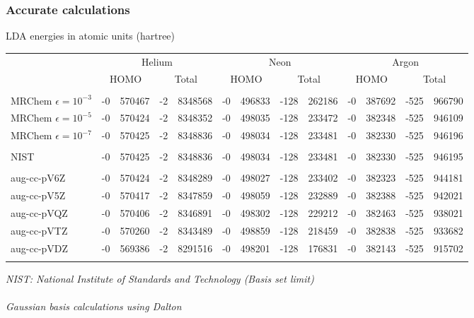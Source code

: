 \documentclass[mathserif]{beamer}
\begin{document}
\begin{frame}
    \frametitle{Accurate calculations}
    LDA energies in atomic units (hartree)
    \begin{table}
	\tiny
	\centering
        \begin{tabular}{lr@{.}lr@{.}lr@{.}lr@{.}lr@{.}lr@{.}l}
	    \hline
	    \hline
	    &
	    \multicolumn{4}{c}{Helium}&\multicolumn{4}{c}{Neon}&\multicolumn{4}{c}{Argon}\\
	    &
	    \multicolumn{2}{c}{HOMO}&\multicolumn{2}{c}{Total}&
	    \multicolumn{2}{c}{HOMO}&\multicolumn{2}{c}{Total}&
	    \multicolumn{2}{c}{HOMO}&\multicolumn{2}{c}{Total}\\
	    \hline
	    &\multicolumn{4}{c}{}&\multicolumn{4}{c}{}&\multicolumn{4}{c}{}\\
	    MRChem $\epsilon=10^{-3}$&	-0&570467&-2&8348568&-0&496833&-128&262186&-0&387692&-525&966790\\
	    MRChem $\epsilon=10^{-5}$&	-0&570424&-2&8348352&-0&498035&-128&233472&-0&382348&-525&946109\\
	    MRChem $\epsilon=10^{-7}$&	-0&570425&-2&8348836&-0&498034&-128&233481&-0&382330&-525&946196\\
	    &\multicolumn{4}{c}{}&\multicolumn{4}{c}{}&\multicolumn{4}{c}{}\\
	    NIST&			-0&570425&-2&8348836&-0&498034&-128&233481&-0&382330&-525&946195\\
	    &\multicolumn{4}{c}{}&\multicolumn{4}{c}{}&\multicolumn{4}{c}{}\\
	    aug-cc-pV6Z&		-0&570424&-2&8348289&-0&498027&-128&233402&-0&382323&-525&944181\\
	    aug-cc-pV5Z&		-0&570417&-2&8347859&-0&498059&-128&232889&-0&382388&-525&942021\\
	    aug-cc-pVQZ&		-0&570406&-2&8346891&-0&498302&-128&229212&-0&382463&-525&938021\\
	    aug-cc-pVTZ&		-0&570260&-2&8343489&-0&498859&-128&218459&-0&382838&-525&933682\\
	    aug-cc-pVDZ&		-0&569386&-2&8291516&-0&498201&-128&176831&-0&382143&-525&915702\\
	    &\multicolumn{4}{c}{}&\multicolumn{4}{c}{}&\multicolumn{4}{c}{}\\
	    \hline
	    \hline
	\end{tabular}
    \end{table}
    \tiny
    \it{NIST: National Institute of Standards and Technology (Basis set limit)}\\
    \ \\
    \it{Gaussian basis calculations using Dalton}\\
\end{frame}
\end{document}

